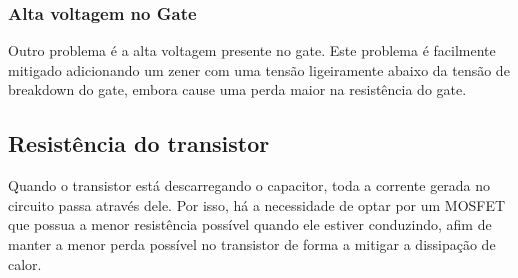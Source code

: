 \subsubsection{Alta voltagem no Gate}
Outro problema é a alta voltagem presente no gate. Este problema é facilmente mitigado adicionando um zener com uma tensão ligeiramente abaixo da tensão de breakdown do gate, embora cause uma perda maior na resistência do gate.

\subsection{Resistência do transistor}
Quando o transistor está descarregando o capacitor, toda a corrente gerada no circuito passa através dele. Por isso, há a necessidade de optar por um MOSFET que possua a menor resistência possível quando ele estiver conduzindo, afim de manter a menor perda possível no transistor de forma a mitigar a dissipação de calor.